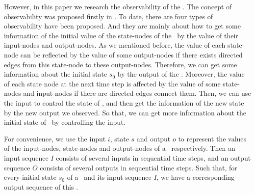 However, in this paper we research the observability of the \BCNs. The concept of observability was proposed firstly in \cite{cheng2009controllability}. To date, there are four types of observability have been proposed. And they are mainly about how to get some information of the initial value of the state-nodes of the \BCNs\ by the value of their input-nodes and output-nodes. As we mentioned before, the value of each state-node can be reflected by the value of some output-nodes if there exists directed edges from this state-node to these output-nodes. Therefore, we can get some information about the initial state $s_0$ by the output of the \BCN.
Moreover, the value of each state node at the next time step is affected by the value of some state-nodes and input-nodes if there are directed edges connect them. Then, we can use the input to control the state of \BCNs, and then get the information of the new state by the new output we observed. So that, we can get more information about the initial state of \BCN\ by controlling the input.

For convenience, we use the input $i$, state $s$ and output $o$ to represent the values of the input-nodes, state-nodes and output-nodes of a \BCN\ respectively. Then an input sequence $I$ consists of several inputs in sequential time steps, and an output sequence $O$ consists of several outputs in sequential time steps. Such that, for every initial state $s_0$ of a \BCN\ and its input sequence $I$, we have a corresponding output sequence of this \BCN.

